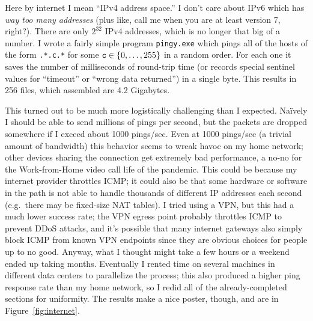 \documentclass[twocolumn]{article}
\begin{document}
Here by internet I mean ``IPv4 address space.'' I don't care about
IPv6 which has {\it way too many addresses} (plus like, call me when
you are at least version 7, right?). There are only $2^{32}$ IPv4
addresses, which is no longer that big of a number. I wrote a fairly
simple program {\tt pingy.exe} which pings all of the hosts of the
form {\tt *.*.c.*} for some ${\tt c} \in \{0,\ldots,255\}$ in a random
order. For each one it saves the number of milliseconds of round-trip
time (or records special sentinel values for ``timeout'' or ``wrong
data returned'') in a single byte. This results in 256 files, which
assembled are 4.2 Gigabytes.

This turned out to be much more logistically challenging than I
expected. Na\"ively I should be able to send millions of pings per
second, but the packets are dropped somewhere if I exceed about 1000
pings/sec. Even at 1000 pings/sec (a trivial amount of bandwidth) this
behavior seems to wreak havoc on my home network; other devices
sharing the connection get extremely bad performance, a no-no for the
Work-from-Home video call life of the pandemic. This could be because
my internet provider throttles ICMP; it could also be that some
hardware or software in the path is not able to handle thousands of
different IP addresses each second (e.g.~there may be fixed-size NAT
tables). I tried using a VPN, but this had a much lower success rate;
the VPN egress point probably throttles ICMP to prevent DDoS attacks,
and it's possible that many internet gateways also simply block ICMP
from known VPN endpoints since they are obvious choices for people up
to no good. Anyway, what I thought might take a few hours or a weekend
ended up taking months. Eventually I rented time on several machines
in different data centers to parallelize the process; this also
produced a higher ping response rate than my home network, so I redid
all of the already-completed sections for uniformity. The results make
a nice poster, though, and are in Figure~\ref{fig:internet}.
\end{document}
